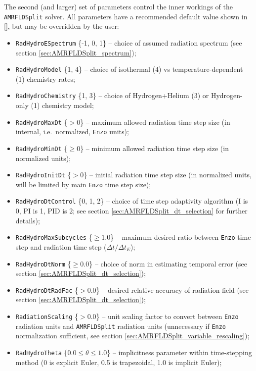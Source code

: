 \documentclass[letterpaper,10pt]{article}
\renewcommand{\(}{\left(}
\renewcommand{\)}{\right)}
\newcommand{\dt}{\Delta t}
\newcommand{\enzo}{{\tt Enzo} }
\begin{document}
The second (and larger) set of parameters control the inner workings
of the {\tt AMRFLDSplit} solver.  All parameters have a recommended
default value shown in [], but may be overridden by the user: 
\begin{itemize}
\item {\tt RadHydroESpectrum} \{-1, 0, 1\; [1]\} -- choice of assumed
  radiation spectrum (see section \ref{sec:AMRFLDSplit_spectrum});
\item {\tt RadHydroModel} \{1, 4\; [1]\} -- choice of isothermal (4)
  vs temperature-dependent (1) chemistry rates;
\item {\tt RadHydroChemistry} \{1, 3\; [1]\} -- choice of
  Hydrogen+Helium (3) or Hydrogen-only (1) chemistry model;
\item {\tt RadHydroMaxDt} \{$>0$\; [$\infty$]\} -- maximum allowed radiation
  time step size (in internal, i.e.~normalized, \enzo units);
\item {\tt RadHydroMinDt} \{$\ge 0$\; [0.0]\} -- minimum allowed
  radiation time step size (in normalized units);
\item {\tt RadHydroInitDt} \{$>0$\; [$\infty$]\} -- initial radiation time
  step size (in normalized units, will be limited by main \enzo time
  step size);
\item {\tt RadHydroDtControl} \{0, 1, 2\; [2]\} -- choice of time step
  adaptivity algorithm (I is 0, PI is 1, PID is 2; see section
  \ref{sec:AMRFLDSplit_dt_selection} for further details);
\item {\tt RadHydroMaxSubcycles} \{$\ge 1.0$\; [1.0]\} -- maximum
  desired ratio between \enzo time step and radiation time step
  ($\dt / \dt_E$);
\item {\tt RadHydroDtNorm} \{$\ge 0.0$\; [2.0]\} -- choice of norm in
  estimating temporal error (see section \ref{sec:AMRFLDSplit_dt_selection});
\item {\tt RadHydroDtRadFac} \{$>0.0$\; [$\infty$]\} -- desired relative
  accuracy of radiation field (see section \ref{sec:AMRFLDSplit_dt_selection});
\item {\tt RadiationScaling} \{$>0.0$\; [1.0]\} -- unit scaling factor
  to convert between \enzo radiation units and {\tt AMRFLDSplit}
  radiation units (unnecessary if \enzo normalization sufficient, see
  section \ref{sec:AMRFLDSplit_variable_rescaling});
\item {\tt RadHydroTheta} \{$0.0 \le \theta \le 1.0$\; [1.0]\} --
  implicitness parameter within time-stepping method (0 is explicit
  Euler, 0.5 is trapezoidal, 1.0 is implicit Euler);

\end{itemize}
\end{document}
